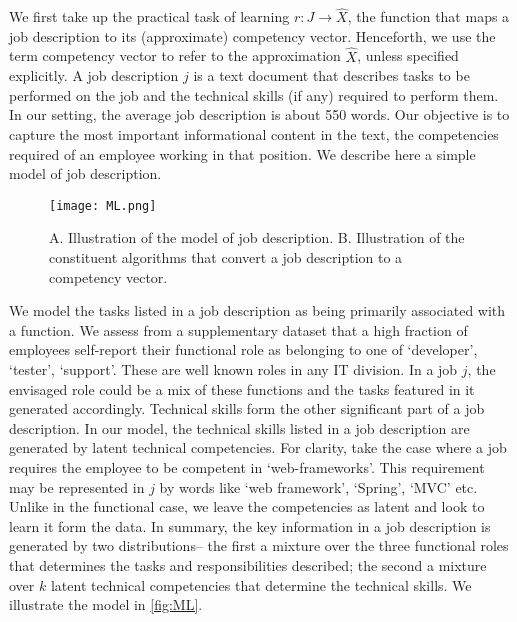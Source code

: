 \documentclass{article}
\begin{document}
We first take up the practical task of learning \( r: J \rightarrow \hat{X} \), the function that maps a job description to its (approximate) competency vector. Henceforth, we use the term competency vector to refer to the approximation \( \hat{X} \), unless specified explicitly. A job description \( j \) is a text document that describes tasks to be performed on the job and the technical skills (if any) required to perform them. In our setting, the average job description is about 550 words. Our objective is to capture the most important informational content in the text, the competencies required of an employee working in that position. We describe here a simple model of job description.


\begin{figure}
    \centering
    \texttt{[image: ML.png]} %
    \caption{A. Illustration of the model of job description. B. Illustration of the constituent algorithms that convert a job description to a competency vector.} %
    \label{fig:ML} 
\end{figure}



We model the tasks listed in a job description as being primarily associated with a function. We assess from a supplementary dataset that a high fraction of employees self-report their functional role as belonging to one of ‘developer’, ‘tester’, ‘support’. These are well known roles in any IT division. In a job \( j \), the envisaged role could be a mix of these functions and the tasks featured in it generated accordingly. Technical skills form the other significant part of a job description. In our model, the technical skills listed in a job description are generated by latent technical competencies. For clarity, take the case where a job requires the employee to be competent in ‘web-frameworks’. This requirement may be represented in \( j \) by words like ‘web framework’, ‘Spring’, ‘MVC’ etc. Unlike in the functional case, we leave the competencies as latent and look to learn it form the data. In summary, the key information in a job description is generated by two distributions-- the first a mixture over the three functional roles that determines the tasks and responsibilities described; the second a mixture over \( k \) latent technical competencies that determine the technical skills. We illustrate the model in \autoref{fig:ML}.
\end{document}

